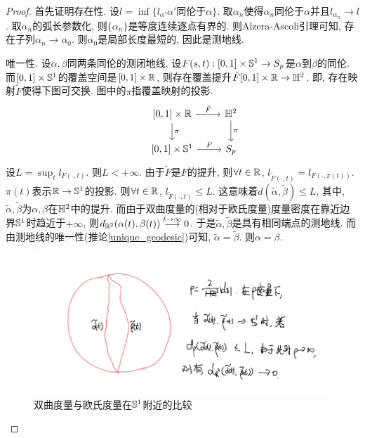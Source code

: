 \begin{proof}
    首先证明存在性. 设$l=\inf \{l_{\alpha'} \alpha'\text{同伦于}\alpha\}$.  取$\alpha_n$使得$\alpha_n$同伦于$\alpha$并且$l_{\alpha_n} \to l$.  取$\alpha_n$的弧长参数化, 则$\{\alpha_n\}$是等度连续逐点有界的. 则Alzera-Ascoli引理可知, 存在子列$\alpha_n \to \alpha_0$. 则$\alpha_0$是局部长度最短的, 因此是测地线.
    \par 唯一性.  设$\alpha, \beta$同两条同伦的测闭地线. 设$F(s,t): [0,1]\times \S^1 \to S_p$是$\alpha$到$\beta$的同伦.  而$[0,1]\times \S^1$的覆盖空间是$[0,1]\times \R$, 则存在覆盖提升$\tilde{F}[0,1]\times \R  \to \HH$. 即, 存在映射$\tilde{F}$使得下图可交换. 图中的$\pi$指覆盖映射的投影.
    \begin{equation}
        \begin{tikzcd}
            & {[0,1]}\times \R  \arrow{r}{\tilde{F}} \arrow{d}{\pi} &\HH \arrow{d}{\pi} \\
            & {[0,1]}\times \S^1 \arrow{r}{F}  & S_p
            \end{tikzcd}
    \end{equation}
    设$L=\sup_t l_{F(\cdot,t)}$. 则$L<+\infty$. 由于$\tilde{F}$是$F$的提升, 则$\forall t \in \R$, $l_{\tilde{F}(\cdot,t)}=l_{F(\cdot,\pi(t))}$.  $\pi(t)$表示$\R \to \S^1$的投影. 则$\forall t \in \R$, $l_{\tilde{F}(\cdot,t)}\le L$. 这意味着$d(\tilde{\alpha}, \tilde{\beta}) \le L$, 其中, $\tilde{\alpha}, \tilde{\beta}$为$\alpha,\beta$在$\HH$中的提升. 而由于双曲度量的(相对于欧氏度量)度量密度在靠近边界$\S^1$时趋近于$+\infty$, 则$d_{\R^2}(\alpha(t),\beta(t)) \overset{t\to \infty}{\longrightarrow} 0$. 于是$\tilde{\alpha}, \tilde{\beta}$是具有相同端点的测地线.  而由测地线的唯一性(推论\eqref{unique_geodesic})可知, $\tilde{\alpha}=\tilde{\beta}$. 则$\alpha=\beta$.
    \begin{figure}[!h]
        \centering
        \includegraphics[scale=0.8]{images/hyper_euclidean.png}
        \caption{双曲度量与欧氏度量在$\S^1$附近的比较}
        \label{hyper_euclidean}
    \end{figure}
\end{proof}
